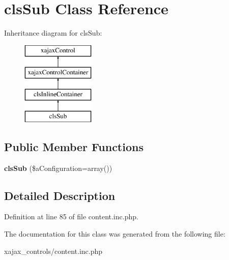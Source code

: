 \hypertarget{classclsSub}{
\section{clsSub Class Reference}
\label{classclsSub}
}
Inheritance diagram for clsSub:\begin{figure}[H]
\begin{center}
\leavevmode
\includegraphics[height=4.000000cm]{classclsSub}
\end{center}
\end{figure}
\subsection*{Public Member Functions}
\begin{DoxyCompactItemize}
\item 
\hypertarget{classclsSub_a8e05e64c97a5500769ced62fdea082b3}{
{\bfseries clsSub} (\$aConfiguration=array())}
\label{classclsSub_a8e05e64c97a5500769ced62fdea082b3}

\end{DoxyCompactItemize}


\subsection{Detailed Description}


Definition at line 85 of file content.inc.php.



The documentation for this class was generated from the following file:\begin{DoxyCompactItemize}
\item 
xajax\_\-controls/content.inc.php\end{DoxyCompactItemize}
